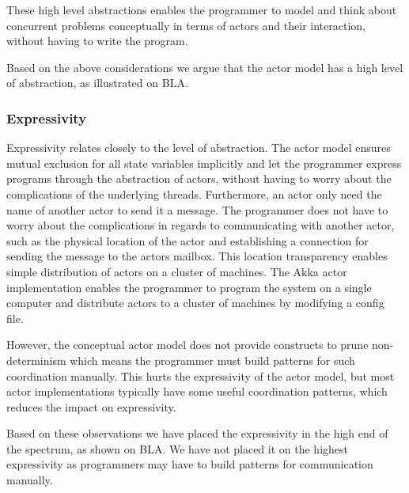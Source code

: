 These high level abstractions enables the programmer to model and think about concurrent problems conceptually in terms of actors and their interaction, without having to write the program.

Based on the above considerations we argue that the actor model has a high level of abstraction, as illustrated on BLA.


\subsubsection{Expressivity}\label{sec:actor_expressivity}
Expressivity relates closely to the level of abstraction. The actor model ensures mutual exclusion for all state variables implicitly and let the programmer express programs through the abstraction of actors, without having to worry about the complications of the underlying threads. Furthermore, an actor only need the name of another actor to send it a message. The programmer does not have to worry about the complications in regards to communicating with another actor, such as the physical location of the actor and establishing a connection for sending the message to the actors mailbox. This location transparency enables simple distribution of actors on a cluster of machines. The Akka actor implementation enables the programmer to program the system on a single computer and distribute actors to a cluster of machines by modifying a config file.

However, the conceptual actor model does not provide constructs to prune non-determinism which means the programmer must build patterns for such coordination manually. This hurts the expressivity of the actor model, but most actor implementations typically have some useful coordination patterns, which reduces the impact on expressivity.

Based on these observations we have placed the expressivity in the high end of the spectrum, as shown on BLA. We have not placed it on the highest expressivity as programmers may have to build patterns for communication manually.



